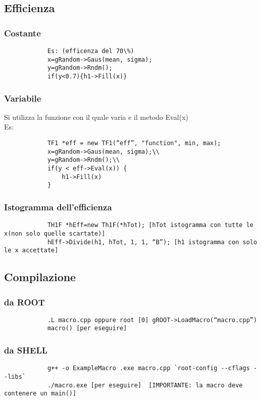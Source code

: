 \documentclass[a4paper]{article}
\begin{document}
    \subsection{Efficienza}
        \subsubsection{Costante}
        \begin{verbatim}
            Es: (efficenza del 70\%)
            x=gRandom->Gaus(mean, sigma);
            y=gRandom->Rndm();
            if(y<0.7){h1->Fill(x)}
        \end{verbatim}
        \subsubsection{Variabile}
        Si utilizza la funzione con il quale varia e il metodo Eval(x)\\
        Es:\\
        \begin{verbatim}
            TF1 *eff = new TF1(“eff”, "function", min, max);
            x=gRandom->Gaus(mean, sigma);\\
            y=gRandom->Rndm();\\
            if(y < eff->Eval(x)) {
                h1->Fill(x)
            }
        \end{verbatim}
        \subsubsection{Istogramma dell'efficienza}
        \begin{verbatim}
            TH1F *hEff=new Th1F(*hTot); [hTot istogramma con tutte le x(non solo quelle scartate)]
            hEff->Divide(h1, hTot, 1, 1, “B”); [h1 istogramma con solo le x accettate]
        \end{verbatim}
    \subsection{Compilazione}
        \subsubsection{da ROOT}
        \begin{verbatim}
            .L macro.cpp oppure root [0] gROOT->LoadMacro(“macro.cpp”)
            macro() [per eseguire]
        \end{verbatim}
        \subsubsection{da SHELL}
        \begin{verbatim}
            g++ -o ExampleMacro .exe macro.cpp `root-config --cflags --libs`
            ./macro.exe [per eseguire]  [IMPORTANTE: la macro deve contenere un main()]
        \end{verbatim}
\end{document}

